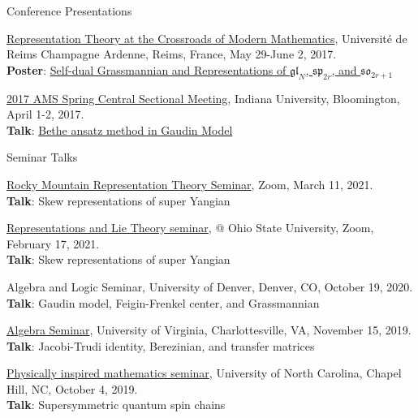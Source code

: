 \documentclass{resume} %
\begin{document}
\begin{rSection}{Conference Presentations}
\begin{rSubsection}{}{}
  \item {\href{http://reims.math.cnrs.fr/pevzner/aak81.html}{Representation Theory at the Crossroads of Modern Mathematics}, Universit\'{e} de Reims Champagne Ardenne, Reims, France, May 29-June 2, 2017. \\
		{\bf Poster}: \href{https://kanglu.me/writings/poster-Reims.pdf}{Self-dual Grassmannian and Representations of $\mathfrak{gl}_N$, $\mathfrak{sp}_{2r}$, and $\mathfrak{so}_{2r+1}$}}\\
  \item {\href{http://www.ams.org/meetings/sectional/2233_program.html}{2017 AMS Spring Central Sectional Meeting}, Indiana University, Bloomington, April 1-2, 2017. \\
		{\bf Talk}: \href{https://kanglu.me/writings/ams-sec-2017.pdf}{Bethe ansatz method in Gaudin Model}}\\
\end{rSubsection}
\end{rSection}

\begin{rSection}{Seminar Talks}
\begin{rSubsection}{}{}
{}{}
  \item {\href{https://sites.google.com/view/rockymountainreptheory/home}{Rocky Mountain Representation Theory Seminar}, Zoom, March 11, 2021.\\
        {\bf Talk}: Skew representations of super Yangian}\\
  \item {\href{https://research.math.osu.edu/reps/}{Representations and Lie Theory seminar}, @ Ohio State University, Zoom, February 17, 2021.\\
        {\bf Talk}: Skew representations of super Yangian}\\
  \item {Algebra and Logic Seminar, University of Denver, Denver, CO, October 19, 2020. \\
		{\bf Talk}:  Gaudin model, Feigin-Frenkel center, and Grassmannian}\\
  \item {\href{https://math.virginia.edu/seminars/algebra/2019-20/}{Algebra Seminar}, University of Virginia, Charlottesville, VA, November 15, 2019. \\
		{\bf Talk}:  Jacobi-Trudi identity, Berezinian, and transfer matrices}\\
  \item {\href{https://math.virginia.edu/seminars/algebra/2019-20/}{Physically inspired mathematics seminar}, University of North Carolina, Chapel Hill, NC, October 4, 2019. \\
		{\bf Talk}: Supersymmetric quantum spin chains}\\
\end{rSubsection}
\end{rSection}
\end{document}
